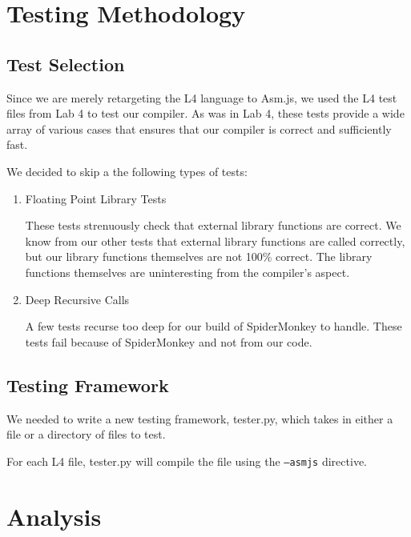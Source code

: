 \documentclass[twoside]{article}
\begin{document}
\begin{multicols}{2}

\section{Testing Methodology}

\subsection{Test Selection}
Since we are merely retargeting the L4 language to Asm.js, we used the L4 test
files from Lab 4 to test our compiler. As was in Lab 4, these tests provide a
wide array of various cases that ensures that our compiler is correct and
sufficiently fast.

We decided to skip a the following types of tests:

\begin{enumerate}
  \item Floating Point Library Tests

    These tests strenuously check that external library functions are correct.
    We know from our other tests that external library functions are called
    correctly, but our library functions themselves are not 100\% correct.
    The library functions themselves are uninteresting from the compiler's
    aspect.

  \item Deep Recursive Calls

    A few tests recurse too deep for our build of SpiderMonkey to handle. These
    tests fail because of SpiderMonkey and not from our code.
\end{enumerate}

\subsection{Testing Framework}

We needed to write a new testing framework, tester.py, which takes in either a
file or a directory of files to test.

For each L4 file, tester.py will compile the file using the \texttt{--asmjs}
directive.


\section{Analysis}




\end{multicols}
\end{document}
